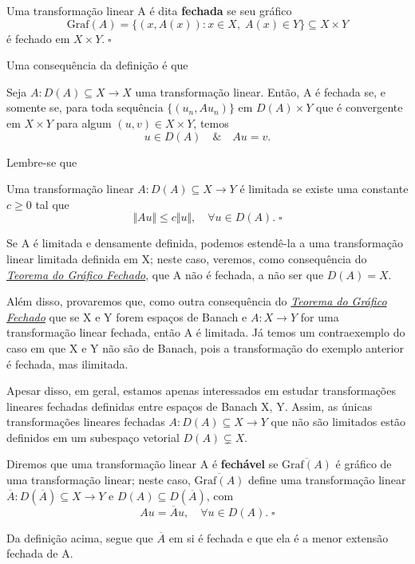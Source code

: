 \documentclass[../functional_analysis.tex]{subfiles}
\begin{document}
\begin{def*}
	Uma transformação linear A é dita \textbf{fechada} se seu gráfico
	\[
		\mathrm{Graf}(A) = \{(x, A(x)): x\in X,\; A(x)\in Y\} \subseteq X\times Y
	\]
	é fechado em \(X\times Y.\; \square\)
\end{def*}
Uma consequência da definição é que
\begin{prop*}
	Seja \(A:D(A)\subseteq X\rightarrow X\) uma transformação linear. Então, A é fechada se, e somente se, para toda sequência \(\{(u_{n}, Au_{n})\}\) em \(D(A)\times Y\) que é convergente em \(X\times Y\) para algum \((u, v)\in X\times Y\), temos
	\[
		u\in D(A) \quad\&\quad Au = v.
	\]
\end{prop*}


Lembre-se que
\begin{def*}
	Uma transformação linear \(A:D(A)\subseteq X\rightarrow Y\) é limitada se existe uma constante \(c\geq 0\) tal que
	\[
		\Vert Au \Vert\leq c\Vert u \Vert,\quad \forall u\in D(A). \;\square
	\]
\end{def*}

Se A é limitada e densamente definida, podemos estendê-la a uma transformação linear limitada definida em X; neste caso, veremos, como consequência do \hyperlink{closed_graphic}{\textit{Teorema do Gráfico Fechado}}, que A não é fechada, a não ser que \(D(A) = X.\)

Além disso, provaremos que, como outra consequência do \hyperlink{closed_graphic}{\textit{Teorema do Gráfico Fechado}} que se X e Y forem espaços de Banach e \(A:X\rightarrow Y\) for uma transformação linear fechada, então A é limitada. Já temos um contraexemplo do caso em que X e Y não são de Banach, pois a transformação do exemplo anterior é fechada, mas ilimitada.

Apesar disso, em geral, estamos apenas interessados em estudar transformações lineares fechadas definidas entre espaços de Banach X, Y. Assim, as únicas transformações lineares fechadas \(A:D(A)\subseteq X\rightarrow Y\) que não são limitados estão definidos em um subespaço vetorial \(D(A)\subsetneq X\).

\begin{def*}
	Diremos que uma transformação linear A é \textbf{fechável} se \(\overline{\mathrm{Graf}(A)}\) é gráfico de uma transformação linear; neste caso, \(\overline{\mathrm{Graf}(A)}\) define uma transformação linear \(\overline{A}: D(\overline{A})\subseteq X\rightarrow Y\) e \(D(A)\subseteq D(\overline{A})\), com
	\[
		Au = \overline{A}u,\quad \forall u\in D(A).\; \square
	\]
\end{def*}
Da definição acima, segue que \(\overline{A}\) em si é fechada e que ela é a menor extensão fechada de A.
\end{document}
